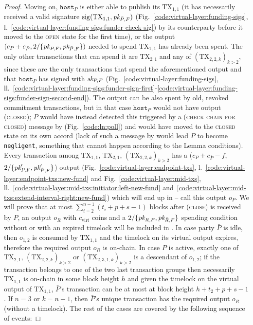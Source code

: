 \begin{proof}
  Moving on, $\texttt{host}_P$ is either able to publish its $\mathrm{TX}_{1,
  1}$ (it has necessarily received a valid signature
  $\mathrm{sig}(\mathrm{TX}_{1, 1}, \textit{pk}_{\bar{P}, F})$
  (Fig.~\ref{code:virtual-layer:funding-sigs},
  l.~\ref{code:virtual-layer:funding-sigs:funder-check-sig}) by its counterparty
  before it moved to the \textsc{open} state for the first time), or the output
  $(c_P + c_{\bar{P}}, 2/\{\textit{pk}_{P, F}, \textit{pk}_{\bar{P}, F}\})$ needed to spend
  $\mathrm{TX}_{1, 1}$ has already been spent. The only other transactions that
  can spend it are $\mathrm{TX}_{2, 1}$ and any of $(\mathrm{TX}_{2, 2, k})_{k >
  2}$, since these are the only transactions that spend the aforementioned
  output and that $\texttt{host}_P$ has signed with $\textit{sk}_{P, F}$
  (Fig.~\ref{code:virtual-layer:funding-sigs},
  ll.~\ref{code:virtual-layer:funding-sigs:funder-sign-first}-\ref{code:virtual-layer:funding-sigs:funder-sign-second-end}).
  The output can be also spent by old, revoked commitment transactions, but in
  that case $\texttt{host}_P$ would not have output (\textsc{closed}); $P$ would
  have instead detected this triggered by a (\textsc{check chain for closed})
  message by \environment (Fig.~\ref{code:ln:poll}) and would have moved to the
  \textsc{closed} state on its own accord (lack of such a message by
  \environment would lead $P$ to become \texttt{negligent}, something that
  cannot happen according to the Lemma conditions). Every transaction among
  $\mathrm{TX}_{1, 1}$, $\mathrm{TX}_{2, 1}$, $(\mathrm{TX}_{2, 2, k})_{k > 2}$
  has a ($c_P + c_{\bar{P}} - f$, $2/\{\textit{pk}_{P, F}', \textit{pk}_{\bar{P}, F}'\}$) output
  (Fig.~\ref{code:virtual-layer:endpoint-txs},
  l.~\ref{code:virtual-layer:endpoint-txs:new-fund} and
  Fig.~\ref{code:virtual-layer:mid-txs},
  ll.~\ref{code:virtual-layer:mid-txs:initiator:left-new-fund}
  and~\ref{code:virtual-layer:mid-txs:extend-interval-right:new-fund}) which
  will end up in \ledger{} -- call this output $o_P$. We will prove that at most
  $\sum\limits_{i=2}^{n-1}(t_i + p + s - 1)$ blocks after (\textsc{close}) is
  received by $P$, an output $o_R$ with $c_{\mathrm{virt}}$ coins and a
  $2/\{\textit{pk}_{R, F}, \textit{pk}_{\bar{R}, F}\}$ spending condition without or with an
  expired timelock will be included in \ledger. In case party $\bar{P}$ is idle,
  then $o_{1, 2}$ is consumed by $\mathrm{TX}_{1, 1}$ and the timelock on its
  virtual output expires, therefore the required output $o_R$ is on-chain. In
  case $\bar{P}$ is active, exactly one of $\mathrm{TX}_{2, 1}$,
  $(\mathrm{TX}_{2, 2, k})_{k > 2}$ or $(\mathrm{TX}_{2, 3, 1, k})_{k > 2}$ is a
  descendant of $o_{1, 2}$; if the transaction belongs to one of the two last
  transaction groups then necessarily $\mathrm{TX}_{1, 1}$ is on-chain in some
  block height $h$ and given the timelock on the virtual output of
  $\mathrm{TX}_{1, 1}$, $\bar{P}$'s transaction can be at most at block height
  $h + t_2 + p + s - 1$. If $n=3$ or $k=n-1$, then $\bar{P}$'s unique
  transaction has the required output $o_R$ (without a timelock). The rest of
  the cases are covered by the following sequence of events:


\end{proof}
